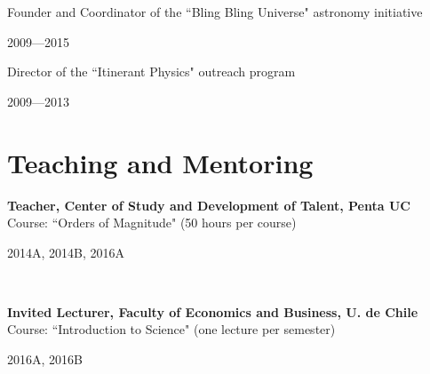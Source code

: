 \documentclass[11pt, a4paper]{article} %
\begin{document}
\vspace{0.3 cm}

\begin{minipage}[t]{0.8\textwidth}
\begin{flushleft}%
  \setlength{\leftskip}{0.2cm}%
Founder and Coordinator of the ``Bling Bling Universe" astronomy initiative
\end{flushleft}
\end{minipage}
\begin{minipage}[t]{0.2\textwidth}
\hfill 2009---2015
\end{minipage}

\vspace{0.3 cm}

\begin{minipage}[t]{0.7\textwidth}
\begin{flushleft}%
  \setlength{\leftskip}{0.2cm}%
Director of the ``Itinerant Physics" outreach program
\end{flushleft}
\end{minipage}
\begin{minipage}[t]{0.3\textwidth}
\hfill 2009---2013
\end{minipage}

\section*{Teaching and Mentoring}

\begin{minipage}[t]{0.7\textwidth}
\begin{flushleft}%
  \setlength{\leftskip}{0.2cm}%
\textbf{Teacher, Center of Study and Development of Talent, Penta UC}\\
Course: ``Orders of Magnitude" (50 hours per course)
\end{flushleft}
\end{minipage}
\begin{minipage}[t]{0.3\textwidth}
\hfill 2014A, 2014B, 2016A
\end{minipage}\\

\begin{minipage}[t]{0.7\textwidth}
\begin{flushleft}%
  \setlength{\leftskip}{0.2cm}%
\textbf{Invited Lecturer, Faculty of Economics and Business, U. de Chile}\\
Course: ``Introduction to Science" (one lecture per semester)
\end{flushleft}
\end{minipage}
\begin{minipage}[t]{0.3\textwidth}
\hfill 2016A, 2016B
\end{minipage}
\end{document}
